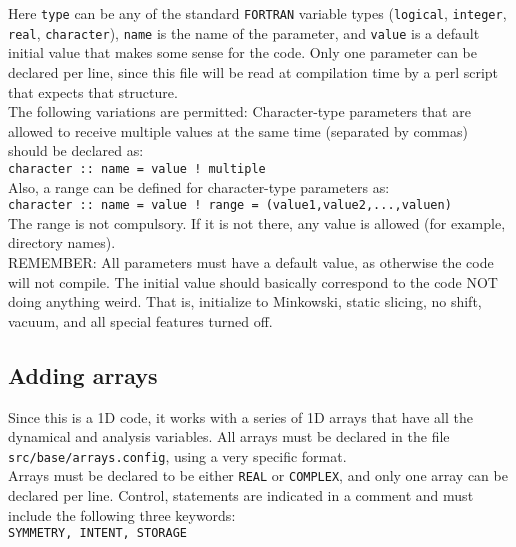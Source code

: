 \documentclass[12pt]{article}
\begin{document}
Here \texttt{type} can be any of the standard \texttt{FORTRAN}
variable types (\texttt{logical}, \texttt{integer}, \texttt{real},
\texttt{character}), \texttt{name} is the name of the parameter, and
\texttt{value} is a default initial value that makes some sense for
the code.  Only one parameter can be declared per line, since this
file will be read at compilation time by a perl script that expects
that structure. \\

The following variations are permitted:  Character-type parameters
that are allowed to receive multiple values at the same time
(separated by commas) should be declared as: \\

\texttt{character :: name = value     ! multiple} \\

Also, a range can be defined for character-type parameters as: \\

\texttt{character :: name = value     ! range = (value1,value2,...,valuen)} \\

The range is not compulsory.  If it is not there, any value
is allowed (for example, directory names). \\

REMEMBER: All parameters must have a default value, as otherwise the
code will not compile.  The initial value should basically correspond
to the code NOT doing anything weird.  That is, initialize to
Minkowski, static slicing, no shift, vacuum, and all special features
turned off. \\


\subsection{Adding arrays}

Since this is a 1D code, it works with a series of 1D arrays that have
all the dynamical and analysis variables. All arrays must be declared
in the file \texttt{src/base/arrays.config}, using a very specific format. \\

Arrays must be declared to be either \texttt{REAL} or
\texttt{COMPLEX}, and only one array can be declared per line.
Control, statements are indicated in a comment and must include the
following three keywords: \\

\texttt{SYMMETRY, INTENT, STORAGE} \\
\end{document}
